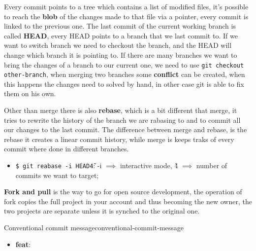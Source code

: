 \documentclass[12pt]{article}
\begin{document}
Every commit points to a tree which contains a list of modified files, it's possible to reach the \textbf{blob} of the changes made to that file via a pointer, every commit is linked to the previous one. The last commit of the current working branch is called \textbf{HEAD}, every HEAD points to a branch that we last commit to. If we want to switch branch we need to checkout the branch, and the HEAD will change which branch it is pointing to. If there are many branches we want to bring the changes of a branch to our current one, we need to use \texttt{git checkout other-branch}, when merging two branches some \textbf{conflict} can be created, when this happens the changes need to solved by hand, in other case git is able to fix them on his own.

Other than merge there is also \textbf{rebase}, which is a bit different that merge, it tries to rewrite the history of the branch we are rabasing to and to commit all our changes to the last commit. The difference between merge and rebase, is the rebase it creates a linear commit history, while merge is keeps traks of every commit where done in different branches.
\begin{itemize}
    \item \texttt{\$ git reabase -i HEAD\~4}: -i $ \implies$ interactive mode, \~4 $ \implies$ number of commits we want to target;
\end{itemize}
\begin{example}{}{}
    
\end{example}
\textbf{Fork and pull} is the way to go for open source development, the operation of fork copies the full project in your account and thus becoming the new owner, the two projects are separate unless it is synched to the original one.

\begin{definition}{Conventional commit message}{conventional-commit-message}
    \begin{itemize}
        \item \textbf{feat}:
    \end{itemize}
\end{definition}
\end{document}
